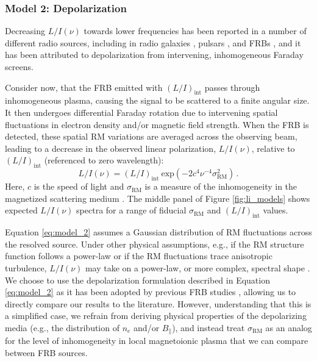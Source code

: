 \documentclass[twocolumn, linenumbers]{aastex701}
\begin{document}
\subsubsection{Model 2: Depolarization} \label{subsec:model_2}
Decreasing $L/I (\nu)$ towards lower frequencies has been reported in a number of different radio sources, including in radio galaxies \citep[e.g.,][]{2012AJ....144..105H, 2014ApJS..212...15F}, pulsars \citep[e.g.,][]{2015A&A...576A..62N, 2019PASA...36...25X, 2021MNRAS.504..228S}, and FRBs \citep[e.g.,][]{2022Sci...375.1266F, 2025MNRAS.tmp.1894U, 2026ApJ..1000L..53P}, and it has been attributed to depolarization from intervening, inhomogeneous Faraday screens.

Consider now, that the FRB emitted with $(L/I)_\mathrm{int}$ passes through inhomogeneous plasma, causing the signal to be scattered to a finite angular size. It then undergoes differential Faraday rotation due to intervening spatial fluctuations in electron density and/or magnetic field strength. When the FRB is detected, these spatial RM variations are averaged across the observing beam, leading to a decrease in the observed linear polarization, $L/I (\nu)$, relative to $(L/I)_\mathrm{int}$ (referenced to zero wavelength):
\begin{equation}
L/I (\nu) = (L/I)_\mathrm{int}~\mathrm{exp} \left(-2 c^4 \nu^{-4} \sigma_\mathrm{RM}^2 \right)\,. \label{eq:model_2}
\end{equation}
Here, $c$ is the speed of light and $\sigma_\mathrm{RM}$ is a measure of the inhomogeneity in the magnetized scattering medium \citep{1966MNRAS.133...67B}. The middle panel of Figure \ref{fig:li_models} shows expected $L/I (\nu)$ spectra for a range of fiducial $\sigma_\mathrm{RM}$ and $(L/I)_\mathrm{int}$ values.

Equation \ref{eq:model_2} assumes a Gaussian distribution of RM fluctuations across the resolved source. Under other physical assumptions, e.g., if the RM structure function follows a power-law or if the RM fluctuations trace anisotropic turbulence, $L/I (\nu)$ may take on a power-law, or more complex, spectral shape \citep{1991MNRAS.250..726T, 2016ApJ...818..178L, 2016ApJ...825..154Z}. We choose to use the depolarization formulation described in Equation \ref{eq:model_2} as it has been adopted by previous FRB studies \citep[e.g.,][]{2022Sci...375.1266F, 2025MNRAS.tmp.1894U, 2026ApJ..1000L..53P}, allowing us to directly compare our results to the literature. However, understanding that this is a simplified case, we refrain from deriving physical properties of the depolarizing media (e.g., the distribution of $n_e$ and/or $B_\parallel$), and instead treat $\sigma_\mathrm{RM}$ as an analog for the level of inhomogeneity in local magnetoionic plasma that we can compare between FRB sources.
\end{document}
